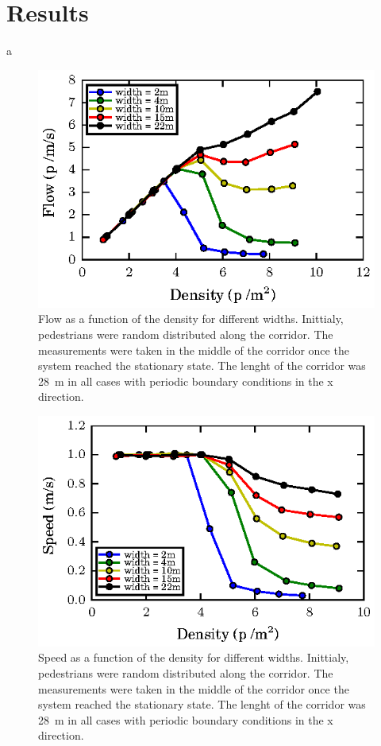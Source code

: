 \section{\label{results}Results}


a
\begin{figure}[htbp!]
\includegraphics[width=\columnwidth]
{plots/flow-density_vd1_multiple_widths.eps}
\caption{\label{fig:1} Flow as a function of the density for different widths. Inittialy, 
pedestrians were random distributed along the corridor. The measurements were taken in the middle
of the corridor once the system reached the stationary state. The lenght of the corridor 
was 28~m in all cases with periodic boundary conditions in the x direction.}
\end{figure}


\begin{figure}[htbp!]
\includegraphics[width=\columnwidth]
{plots/speed-density_vd1_multiple_widths.eps}
\caption{\label{fig:2} Speed as a function of the density for different widths. Inittialy, 
pedestrians were random distributed along the corridor. The measurements were taken in the middle
of the corridor once the system reached the stationary state. The lenght of the corridor 
was 28~m in all cases with periodic boundary conditions in the x direction.}
\end{figure}


